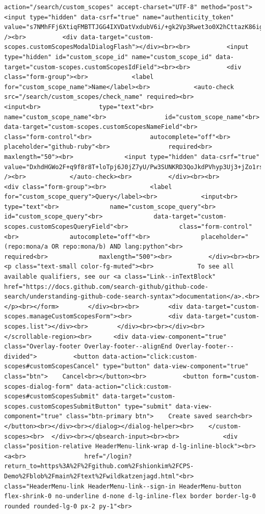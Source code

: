 \documentclass[
  letterpaper,
]{book}
\begin{document}
\begin{verbatim}
action="/search/custom_scopes" accept-charset="UTF-8" method="post"><input type="hidden" data-csrf="true" name="authenticity_token" value="s7NMhFFj6XtiqFMBTTJGG4IXVDatVxdubV6i/+gk2Vp3Rwet3o0X2hCttazK86ig70pci+aseGRsuuiIz7QOMQ==" /><br>          <div data-target="custom-scopes.customScopesModalDialogFlash"></div><br><br>          <input type="hidden" id="custom_scope_id" name="custom_scope_id" data-target="custom-scopes.customScopesIdField"><br><br>          <div class="form-group"><br>            <label for="custom_scope_name">Name</label><br>            <auto-check src="/search/custom_scopes/check_name" required><br>              <input<br>                type="text"<br>                name="custom_scope_name"<br>                id="custom_scope_name"<br>                data-target="custom-scopes.customScopesNameField"<br>                class="form-control"<br>                autocomplete="off"<br>                placeholder="github-ruby"<br>                required<br>                maxlength="50"><br>              <input type="hidden" data-csrf="true" value="DxhdHGWo2F+q9f8r8T+loTpj6J0jZ7yU/Pw3SUNKRD3QoJkdPVhyp3Uj3+jZo1rsSDkZ69653ZjfqtLixRVTIg==" /><br>            </auto-check><br>          </div><br><br>          <div class="form-group"><br>            <label for="custom_scope_query">Query</label><br>            <input<br>              type="text"<br>              name="custom_scope_query"<br>              id="custom_scope_query"<br>              data-target="custom-scopes.customScopesQueryField"<br>              class="form-control"<br>              autocomplete="off"<br>              placeholder="(repo:mona/a OR repo:mona/b) AND lang:python"<br>              required<br>              maxlength="500"><br>          </div><br><br>          <p class="text-small color-fg-muted"><br>            To see all available qualifiers, see our <a class="Link--inTextBlock" href="https://docs.github.com/search-github/github-code-search/understanding-github-code-search-syntax">documentation</a>.<br>          </p><br></form>        </div><br><br>        <div data-target="custom-scopes.manageCustomScopesForm"><br>          <div data-target="custom-scopes.list"></div><br>        </div><br><br></div><br>      </scrollable-region><br>      <div data-view-component="true" class="Overlay-footer Overlay-footer--alignEnd Overlay-footer--divided">          <button data-action="click:custom-scopes#customScopesCancel" type="button" data-view-component="true" class="btn">    Cancel<br></button><br>          <button form="custom-scopes-dialog-form" data-action="click:custom-scopes#customScopesSubmit" data-target="custom-scopes.customScopesSubmitButton" type="submit" data-view-component="true" class="btn-primary btn">    Create saved search<br></button><br></div><br></dialog></dialog-helper><br>    </custom-scopes><br>  </div><br></qbsearch-input><br><br>            <div class="position-relative HeaderMenu-link-wrap d-lg-inline-block"><br>              <a<br>                href="/login?return_to=https%3A%2F%2Fgithub.com%2Fshionkim%2FCPS-Demo%2Fblob%2Fmain%2Ftext%2Fwildkatzenjagd.html"<br>                class="HeaderMenu-link HeaderMenu-link--sign-in HeaderMenu-button flex-shrink-0 no-underline d-none d-lg-inline-flex border border-lg-0 rounded rounded-lg-0 px-2 py-1"<br>           
\end{verbatim}
\end{document}
